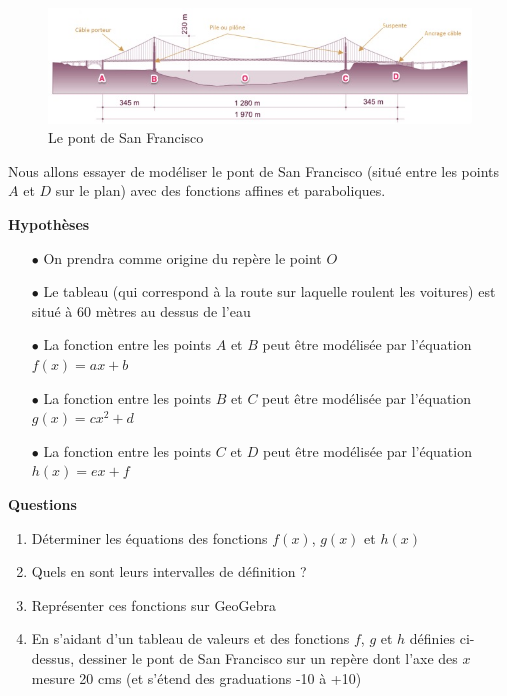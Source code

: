 \documentclass[a4paper,12pt]{article}
\begin{document}
  \begin{figure}[H]
    \centering
    \includegraphics[width=\linewidth]{pont_san_francisco.jpg}
    \caption{\label{} Le pont de San Francisco}
\end{figure}

Nous allons essayer de modéliser le pont de San Francisco (situé entre les points \(A\) et \(D\) sur le plan) avec des fonctions affines et paraboliques. \par
\vspace{0.5cm}
\textbf{Hypothèses}
\begin{itemize}[noitemsep]
  \item[$\bullet$] On prendra comme origine du repère le point \(O\)
  \item[$\bullet$] Le tableau (qui correspond à la route sur laquelle roulent les voitures) est situé à 60 mètres au dessus de l'eau
  \item[$\bullet$] La fonction entre les points \(A\) et \(B\) peut être modélisée par l'équation \(f(x) = ax+b\)
  \item[$\bullet$] La fonction entre les points \(B\) et \(C\) peut être modélisée par l'équation \(g(x) = cx^2+d\)
  \item[$\bullet$] La fonction entre les points \(C\) et \(D\) peut être modélisée par l'équation \(h(x) = ex+f\) 
\end{itemize}

\textbf{Questions}

\begin{enumerate}[noitemsep, label=(\arabic*)]
  \item Déterminer les équations des fonctions \(f(x)\), \(g(x)\) et \(h(x)\)
  \item Quels en sont leurs intervalles de définition ?
  \item Représenter ces fonctions sur GeoGebra
  \item En s'aidant d'un tableau de valeurs et des fonctions \(f\), \(g\) et \(h\) définies ci-dessus, dessiner le pont de San Francisco sur un repère dont l'axe des \(x\) mesure 20 cms (et s'étend des graduations -10 à +10)
\end{enumerate}
\end{document}
